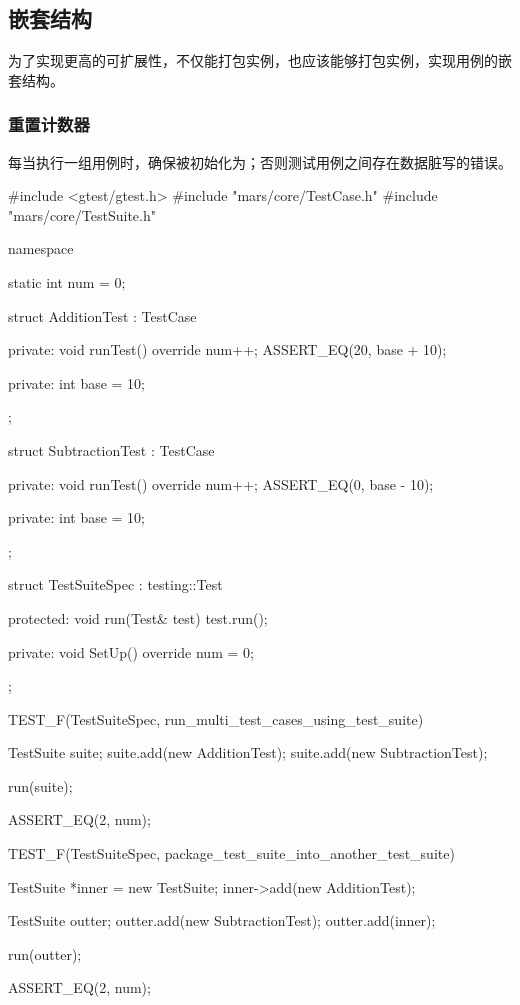 \begin{content}
\subsection{嵌套结构}

为了实现更高的可扩展性，不仅能打包实例，也应该能够打包实例，实现用例的嵌套结构。

\subsubsection{重置计数器}

每当执行一组用例时，确保被初始化为；否则测试用例之间存在数据脏写的错误。

\begin{leftbar}
 \begin{c++}[caption={\ttfamily{test/mars/core/TestSuiteSpec.cc}}]
#include <gtest/gtest.h>
#include "mars/core/TestCase.h"
#include "mars/core/TestSuite.h"

namespace {
  static int num = 0;

  struct AdditionTest : TestCase {
  private:
    void runTest() override {
      num++;
      ASSERT_EQ(20, base + 10);
    }

  private:
    int base = 10;
  };

  struct SubtractionTest : TestCase {
  private:
    void runTest() override {
      num++;
      ASSERT_EQ(0, base - 10);
    }

  private:
    int base = 10;
  };

  struct TestSuiteSpec : testing::Test {
  protected:
    void run(Test& test) {
      test.run();
    }
  
  private:
    void SetUp() override {
      num = 0;
    }
  };
}

TEST_F(TestSuiteSpec, run_multi_test_cases_using_test_suite) {
  TestSuite suite;
  suite.add(new AdditionTest);
  suite.add(new SubtractionTest);

  run(suite);

  ASSERT_EQ(2, num);
}

TEST_F(TestSuiteSpec, package_test_suite_into_another_test_suite) {
  TestSuite *inner = new TestSuite;
  inner->add(new AdditionTest);

  TestSuite outter;
  outter.add(new SubtractionTest);
  outter.add(inner);

  run(outter);

  ASSERT_EQ(2, num);
}
 \end{c++}
\end{leftbar}


\end{content}
